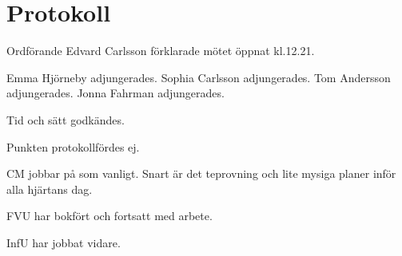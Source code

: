 \documentclass[10pt]{article}
\def\mo{Edvard Carlsson}
\begin{document}
\section*{Protokoll}
\begin{paragrafer}
Ordförande {\mo} förklarade mötet öppnat kl.12.21.

{\valavmo}

{\valavms}

{\valavj}

{\tosg}

Emma Hjörneby adjungerades. \newline 
Sophia Carlsson adjungerades.\newline 
Tom Andersson adjungerades.\newline 
Jonna Fahrman adjungerades.


Tid och sätt godkändes.





\begin{fyllnadsval} %

\end{fyllnadsval}

\begin{paragrafer}
Punkten protokollfördes ej.

CM jobbar på som vanligt. Snart är det teprovning och lite mysiga planer inför alla hjärtans dag.

FVU har bokfört och fortsatt med arbete.

InfU har jobbat vidare.


\end{paragrafer}
\end{paragrafer}
\end{document}
